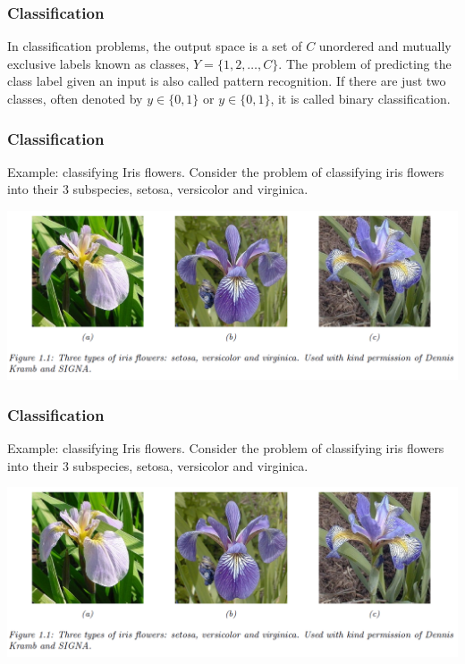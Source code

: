 \documentclass[spanish]{beamer}
\begin{document}
\begin{frame}
\frametitle{Classification} 
In classification problems, the output space is a set of $C$ unordered and mutually exclusive labels
known as classes, $Y = \lbrace1, 2, \ldots ,C\rbrace$. The problem of predicting the class label given an input is
also called pattern recognition. If there are just two classes, often denoted by $y  \in \lbrace 0, 1\rbrace$ or
$y  \in \lbrace 0, 1\rbrace$, it is called binary classification.

\end{frame}
\begin{frame}
\frametitle{Classification}  
Example: classifying Iris flowers. Consider the problem of classifying iris flowers into their 3 subspecies, setosa, versicolor
and virginica.
\begin{center}
\includegraphics[width=\textwidth]{im2}
\end{center}
\end{frame}
\begin{frame}
\frametitle{Classification}  
Example: classifying Iris flowers. Consider the problem of classifying iris flowers into their 3 subspecies, setosa, versicolor
and virginica.
\begin{center}
\includegraphics[width=\textwidth]{im2}
\end{center}
\end{frame}
\end{document}
